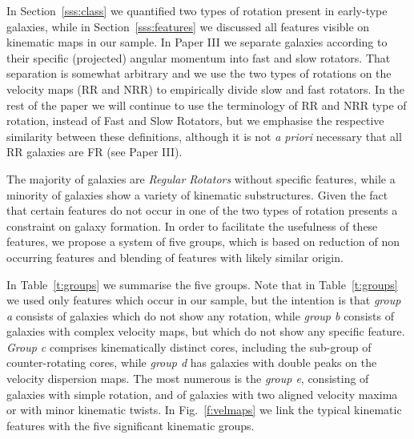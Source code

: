 \documentclass[usenatbib,usegraphicx]{mn2e}
\begin{document}
In Section~\ref{sss:class} we quantified two types of rotation present in early-type galaxies, while in Section~\ref{sss:features} we discussed all features visible on kinematic maps in our sample. In Paper III we separate galaxies according to their specific (projected) angular momentum into fast and slow rotators. That separation is somewhat arbitrary and we use the two types of rotations on the velocity maps (RR and NRR) to empirically divide slow and fast rotators. In the rest of the paper we will continue to use the terminology of RR and NRR type of rotation, instead of Fast and Slow Rotators, but we emphasise the respective similarity between these definitions, although it is not {\it a priori} necessary that all RR galaxies are FR (see Paper III).

The majority of galaxies are {\it Regular Rotators} without specific features, while a minority of galaxies show a variety of kinematic substructures. Given the fact that certain features do not occur in one of the two types of rotation presents a constraint on galaxy formation.  In order to facilitate the usefulness of these features, we propose a system of five groups, which is based on reduction of non occurring features and blending of features with likely similar origin. 

In Table~\ref{t:groups} we summarise the five groups. Note that in Table~\ref{t:groups} we used only features which occur in our sample, but the intention is that {\it group a} consists of galaxies which do not show any rotation, while {\it group b} consists of galaxies with complex velocity maps, but which do not show any specific feature. {\it Group c} comprises kinematically distinct cores, including the sub-group of counter-rotating cores, while {\it group d} has galaxies with double peaks on the velocity dispersion maps. The most numerous is the {\it group e}, consisting of galaxies with simple rotation, and of galaxies with two aligned velocity maxima or with minor kinematic twists. In Fig.~\ref{f:velmaps} we link the typical kinematic features with the five significant kinematic groups.  
\end{document}
